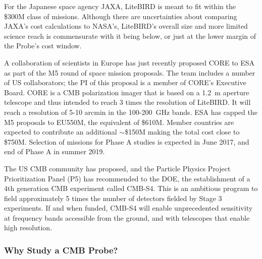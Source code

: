 For the Japanese space agency JAXA, LiteBIRD is meant to fit within the \$300M class of missions. 
Although there are uncertainties about comparing JAXA's cost calculations to NASA's, LiteBIRD's overall size 
and more limited science reach is commensurate with it being below, or just at the lower margin of the Probe's
cost window. 

A collaboration of scientists in Europe has just recently proposed CORE to ESA as part of the M5 round 
of space mission proposals. 
The team includes a number of US collaborators; the PI of this proposal is a member of 
CORE's Executive Board. CORE is a CMB polarization imager that is based on a 
1.2~m aperture telescope and thus intended to reach 3 times the resolution of LiteBIRD. 
It will reach a resolution of 5-10 arcmin in the 100-200~GHz bands. ESA has 
capped the M5 proposals to EU550M, the equivalent of 
\$610M. Member countries are expected to contribute an additional $\sim$\$150M making the total
cost close to \$750M. Selection of missions for Phase A studies is expected in June 2017, and
end of Phase A in summer 2019.

The US CMB community has proposed, and the Particle Physics Project Prioritization Panel (P5) has recommended 
to the DOE, the establishment of a 4th generation CMB experiment called CMB-S4. This is an ambitious 
program to field approximately 5 times the number of detectors fielded by Stage 3 experiments. If and when funded, 
CMB-S4 will enable unprecedented sensitivity at frequency bands accessible from the ground, and 
with telescopes that enable high resolution. 


\vspace{-0.18in}

\subsubsection{Why Study a CMB Probe?} 

\vspace{-0.05in}


